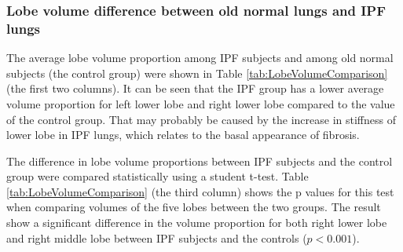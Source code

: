 
\subsubsection{Lobe volume difference between old normal lungs and IPF lungs}
The average lobe volume proportion among IPF subjects and among old normal subjects (the control group) were shown in Table \ref{tab:LobeVolumeComparison} (the first two columns). It can be seen that the IPF group has a lower average volume proportion for left lower lobe and right lower lobe compared to the value of the control group. That may probably be caused by the increase in stiffness of lower lobe in IPF lungs, which relates to the basal appearance of fibrosis.

The difference in lobe volume proportions between IPF subjects and the control group were compared statistically using a student t-test. Table \ref{tab:LobeVolumeComparison} (the third column) shows the p values for this test when comparing volumes of the five lobes between the two groups. The result show a significant difference in the volume proportion for both right lower lobe and right middle lobe between IPF subjects and the controls ($p<0.001$). 

